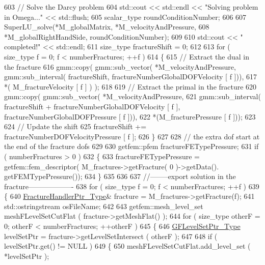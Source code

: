 \begin{DoxyCode}
603     \textcolor{comment}{// Solve the Darcy problem}
604     std::cout << std::endl << \textcolor{stringliteral}{"Solving problem in Omega..."} << std::flush;
605     scalar\_type roundConditionNumber;
606 
607     SuperLU\_solve(*M\_globalMatrix, *M\_velocityAndPressure,
608                   *M\_globalRightHandSide, roundConditionNumber);
609 
610     std::cout << \textcolor{stringliteral}{" completed!"} << std::endl;
611     size\_type fractureShift = 0;
612 
613     \textcolor{keywordflow}{for} ( size\_type f = 0; f < numberFractures; ++f )
614     \{ 
615         \textcolor{comment}{// Extract the dual in the fracture}
616         gmm::copy( gmm::sub\_vector( *M\_velocityAndPressure, gmm::sub\_interval( fractureShift, 
      fractureNumberGlobalDOFVelocity [ f ])),
617                   *( M\_fractureVelocity [ f ] ) );
618 
619         \textcolor{comment}{// Extract the primal in the fracture}
620         gmm::copy( gmm::sub\_vector( *M\_velocityAndPressure, 
621                                     gmm::sub\_interval( fractureShift + fractureNumberGlobalDOFVelocity [ f 
      ], fractureNumberGlobalDOFPressure [ f ])), 
622                    *(M\_fracturePressure [ f ]));
623 
624         \textcolor{comment}{// Update the shift}
625         fractureShift += fractureNumberDOFVelocityPressure [ f ];
626     \}
627 
628     \textcolor{comment}{// the extra dof start at the end of the fracture dofs}
629   
630     getfem::pfem fractureFETypePressure;
631     \textcolor{keywordflow}{if} ( numberFractures > 0 )
632     \{
633         fractureFETypePressure = getfem::fem\_descriptor( M\_fractures->getFracture( 0 )->getData().
      getFEMTypePressure());
634     \}
635 
636 
637     \textcolor{comment}{//--------export solution in the fracture-------------------}
638     \textcolor{keywordflow}{for} ( size\_type f = 0; f < numberFractures; ++f )
639     \{
640         \hyperlink{FractureHandler_8h_af23fb7a30aaff864bd42587af4f1e78a}{FractureHandlerPtr\_Type}& fracture = M\_fractures->getFracture(f);
641         std::ostringstream osFileName;
642 
643         getfem::mesh\_level\_set meshFLevelSetCutFlat ( fracture->getMeshFlat() );
644         \textcolor{keywordflow}{for} ( size\_type otherF = 0; otherF < numberFractures; ++otherF )
645         \{
646             \hyperlink{Core_8h_a036173458a8a25c7c03f8c76d97e9580}{GFLevelSetPtr\_Type} levelSetPtr = fracture->getLevelSetIntersect ( otherF );
647 
648             \textcolor{keywordflow}{if} ( levelSetPtr.get() != NULL )
649             \{
650                 meshFLevelSetCutFlat.add\_level\_set ( *levelSetPtr );

\end{DoxyCode}
